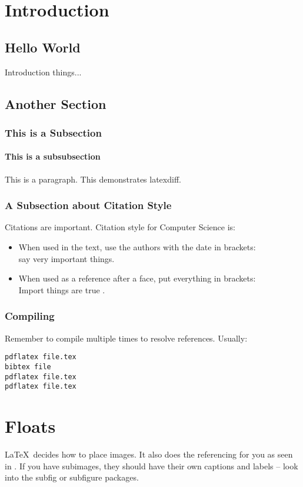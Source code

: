 \documentclass[a4paper,twoside,12pt]{report}
\begin{document}
\chapter{Introduction}
\section{Hello World}
Introduction things...\\
\section{Another Section}
\subsection{This is a Subsection}
\subsubsection{This is a subsubsection}
This is a paragraph. This demonstrates latexdiff.
\subsection{A Subsection about Citation Style}
Citations are important. Citation style for Computer Science is:
\begin{itemize}
\item When used in the text, use the authors with the date in brackets:\\ \citet{klein17} say very important things.
\item When used as a reference after a face, put everything in brackets:\\ Import things are true \citep{klein17}.
\end{itemize}

\subsection{Compiling}
Remember to compile multiple times to resolve references. Usually:
\begin{verbatim}
pdflatex file.tex
bibtex file
pdflatex file.tex
pdflatex file.tex
\end{verbatim}


\chapter{Floats}
\LaTeX\ decides how to place images. It also does the referencing for you as seen in . If you have subimages, they should have their own captions and labels -- look into the subfig or subfigure packages.
\end{document}
